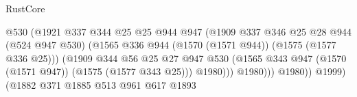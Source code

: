 \begin{lexlean}{RustCore}
\begin{coremodule}
                                                    @530
                                                    (@1921
                                                      @337
                                                      @344
                                                      @25
                                                      @25
                                                      @944
                                                      @947
                                                      (@1909
                                                        @337
                                                        @346
                                                        @25
                                                        @28
                                                        @944
                                                        (@524 @947 @530)
                                                        (@1565
                                                          @336
                                                          @944
                                                          (@1570 (@1571 @944))
                                                          (@1575 (@1577 @336 @25)))
                                                        (@1909
                                                          @344
                                                          @56
                                                          @25
                                                          @27
                                                          @947
                                                          @530
                                                          (@1565
                                                            @343
                                                            @947
                                                            (@1570 (@1571 @947))
                                                            (@1575 (@1577 @343 @25)))
                                                          @1980)))
                                                    @1980)))
                                              @1980))
                                          @1999)
                                        (@1882
                                          @371
                                          @1885
                                          @513
                                          @961
                                          @617
                                          @1893

\end{coremodule}
\end{lexlean}
